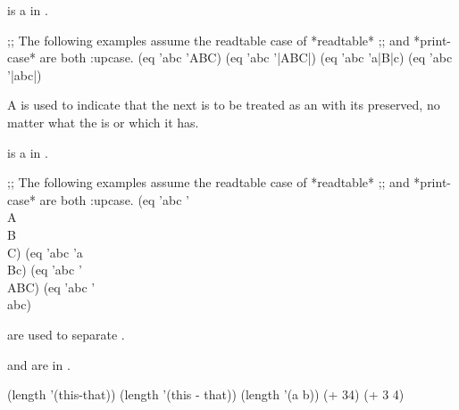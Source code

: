  is a  
in .


\code
 ;; The following examples assume the readtable case of *readtable* 
 ;; and *print-case* are both :upcase.
 (eq 'abc 'ABC) \EV {}
 (eq 'abc '|ABC|) \EV {}
 (eq 'abc 'a|B|c) \EV {}
 (eq 'abc '|abc|) \EV {}
\endcode

\endsubsubsubsection%

\endsubsubsection%


A  is used to indicate that 
the next  is to be treated as 
an  
with its  preserved,
no matter what the  is 
or which  it has.  

 is a   in .


\code
 ;; The following examples assume the readtable case of *readtable* 
 ;; and *print-case* are both :upcase.
 (eq 'abc '\\A\\B\\C) \EV {}
 (eq 'abc 'a\\Bc) \EV {}
 (eq 'abc '\\ABC) \EV {}
 (eq 'abc '\\abc) \EV {}
\endcode

\endsubsubsubsection%

\endsubsubsection%


  are used to separate .

 and  are  
in .


\code
 (length '(this-that)) 
 (length '(this - that)) 
 (length '(a
           b)) 
 (+ 34) 
 (+ 3 4) 
\endcode

\endsubsubsubsection%

\endsubsubsection%

\endSubsection%
